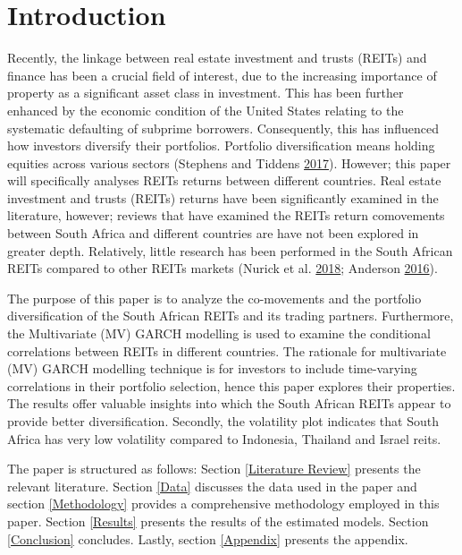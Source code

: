 \documentclass[11pt,preprint, authoryear]{elsarticle}
\numberwithin{equation}{section}
\numberwithin{figure}{section}
\numberwithin{table}{section}
\begin{document}
\headsep 35pt %




\hypertarget{introduction}{%
\section{\texorpdfstring{Introduction
\label{Introduction}}{Introduction }}\label{introduction}}

Recently, the linkage between real estate investment and trusts (REITs)
and finance has been a crucial field of interest, due to the increasing
importance of property as a significant asset class in investment. This
has been further enhanced by the economic condition of the United States
relating to the systematic defaulting of subprime borrowers.
Consequently, this has influenced how investors diversify their
portfolios. Portfolio diversification means holding equities across
various sectors (Stephens and Tiddens
\protect\hyperlink{ref-stephensinter2017}{2017}). However; this paper
will specifically analyses REITs returns between different countries.
Real estate investment and trusts (REITs) returns have been
significantly examined in the literature, however; reviews that have
examined the REITs return comovements between South Africa and different
countries are have not been explored in greater depth. Relatively,
little research has been performed in the South African REITs compared
to other REITs markets (Nurick et al.
\protect\hyperlink{ref-nurick2018investigation}{2018}; Anderson
\protect\hyperlink{ref-anderson2016place}{2016}).

The purpose of this paper is to analyze the co-movements and the
portfolio diversification of the South African REITs and its trading
partners. Furthermore, the Multivariate (MV) GARCH modelling is used to
examine the conditional correlations between REITs in different
countries. The rationale for multivariate (MV) GARCH modelling technique
is for investors to include time-varying correlations in their portfolio
selection, hence this paper explores their properties. The results offer
valuable insights into which the South African REITs appear to provide
better diversification. Secondly, the volatility plot indicates that
South Africa has very low volatility compared to Indonesia, Thailand and
Israel reits.

The paper is structured as follows: Section \ref{Literature Review}
presents the relevant literature. Section \ref{Data} discusses the data
used in the paper and section \ref{Methodology} provides a comprehensive
methodology employed in this paper. Section \ref{Results} presents the
results of the estimated models. Section \ref{Conclusion} concludes.
Lastly, section \ref{Appendix} presents the appendix.
\end{document}
